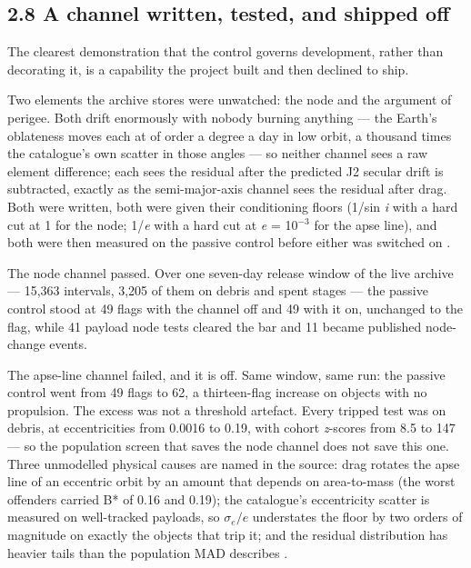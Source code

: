 \documentclass[11pt]{article}
\begin{document}
\subsection*{2.8 A channel written, tested, and shipped off}

The clearest demonstration that the control governs development, rather than decorating it, is a capability the project built and then declined to ship.

Two elements the archive stores were unwatched: the node and the argument of perigee. Both drift enormously with nobody burning anything --- the Earth's oblateness moves each at of order a degree a day in low orbit, a thousand times the catalogue's own scatter in those angles --- so neither channel sees a raw element difference; each sees the residual after the predicted J2 secular drift is subtracted, exactly as the semi-major-axis channel sees the residual after drag. Both were written, both were given their conditioning floors (1/sin \emph{i} with a hard cut at 1\textdegree{} for the node; 1/\emph{e} with a hard cut at \emph{e} = 10\ensuremath{^{-3}} for the apse line), and both were then measured on the passive control before either was switched on%
.

The node channel passed. Over one seven-day release window of the live archive --- 15,363 intervals, 3,205 of them on debris and spent stages --- the passive control stood at 49 flags with the channel off and 49 with it on, unchanged to the flag, while 41 payload node tests cleared the bar and 11 became published node-change events.

The apse-line channel failed, and it is off. Same window, same run: the passive control went from 49 flags to 62, a thirteen-flag increase on objects with no propulsion. The excess was not a threshold artefact. Every tripped test was on debris, at eccentricities from 0.0016 to 0.19, with cohort \emph{z}-scores from 8.5 to 147 --- so the population screen that saves the node channel does not save this one. Three unmodelled physical causes are named in the source: drag rotates the apse line of an eccentric orbit by an amount that depends on area-to-mass (the worst offenders carried B* of 0.16 and 0.19); the catalogue's eccentricity scatter is measured on well-tracked payloads, so $\sigma_e/e$ understates the floor by two orders of magnitude on exactly the objects that trip it; and the residual distribution has heavier tails than the population MAD describes%
.
\end{document}
